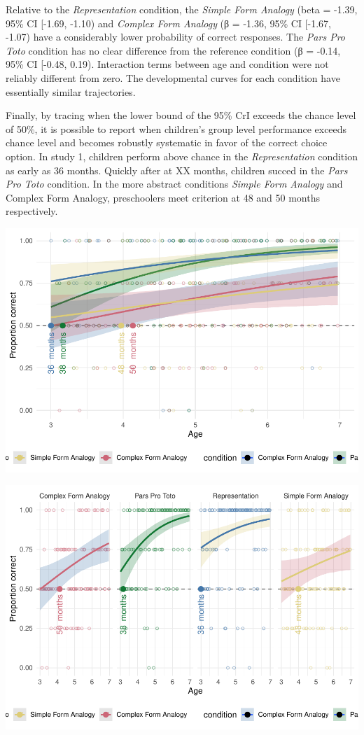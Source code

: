 \documentclass[
  man]{apa6}
\begin{document}
Relative to the \emph{Representation} condition, the \emph{Simple Form Analogy} (beta = -1.39, 95\% CI {[}-1.69, -1.10) and \emph{Complex Form Analogy} (β = -1.36, 95\% CI {[}-1.67, -1.07) have a considerably lower probability of correct responses. The \emph{Pars Pro Toto} condition has no clear difference from the reference condition (β = -0.14, 95\% CI {[}-0.48, 0.19). Interaction terms between age and condition were not reliably different from zero. The developmental curves for each condition have essentially similar trajectories.

Finally, by tracing when the lower bound of the 95\% CrI exceeds the chance level of 50\%, it is possible to report when children's group level performance exceeds chance level and becomes robustly systematic in favor of the correct choice option. In study 1, children perform above chance in the \emph{Representation} condition as early as 36 months. Quickly after at XX months, children succed in the \emph{Pars Pro Toto} condition. In the more abstract conditions \emph{Simple Form Analogy} and Complex Form Analogy, preschoolers meet criterion at 48 and 50 months respectively.

\includegraphics{symlit_rep_manuscript_files/figure-latex/S1_bayes_plot_no_facets-1.pdf}

\includegraphics{symlit_rep_manuscript_files/figure-latex/S1_bayes_plot-1.pdf}
\end{document}
